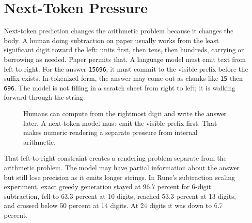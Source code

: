 \documentclass[acmsmall,screen,nonacm]{acmart}
\begin{document}
\section{Next-Token Pressure}

Next-token prediction changes the arithmetic problem because it changes the
body. A human doing subtraction on paper usually works from the least
significant digit toward the left: units first, then tens, then hundreds,
carrying or borrowing as needed. Paper permits that. A language model must emit
text from left to right. For the answer \texttt{15696}, it must commit to the
visible prefix before the suffix exists. In tokenized form, the answer may come
out as chunks like \texttt{15} then \texttt{696}. The model is not filling in a
scratch sheet from right to left; it is walking forward through the string.

\begin{figure}[t]
  \centering
  \caption{Humans can compute from the rightmost digit and write the answer
  later. A next-token model must emit the visible prefix first. That makes
  numeric rendering a separate pressure from internal arithmetic.}
\end{figure}

That left-to-right constraint creates a rendering problem separate from the
arithmetic problem. The model may have partial information about the answer but
still lose precision as it emits longer strings. In Rune's subtraction scaling
experiment, exact greedy generation stayed at 96.7 percent for 6-digit
subtraction, fell to 63.3 percent at 10 digits, reached 53.3 percent at 13
digits, and crossed below 50 percent at 14 digits. At 24 digits it was down to
6.7 percent.
\end{document}
